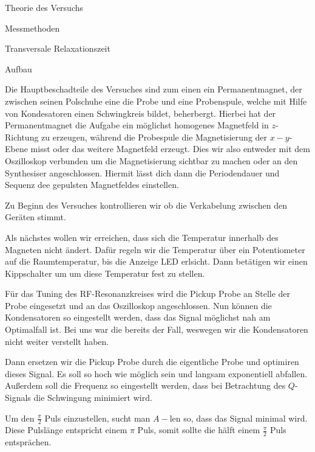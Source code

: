 \documentclass[pdftex, a4paper,11pt, twoside, ngerman]{report}
\begin{document}
\begin{chapter}{Theorie des Versuchs}
\begin{section}{Messmethoden}
\begin{subsection}{Transversale Relaxationszeit}
        \end{subsection}

    \end{section}

    \begin{section}{Aufbau}

        Die Hauptbeschadteile des Versuches sind zum einen ein Permanentmagnet, der zwischen seinen Polschuhe eine die Probe und eine Probenspule, welche mit Hilfe von Kondesatoren einen Schwingkreis bildet, beherbergt.
        Hierbei hat der Permanentmagnet die Aufgabe ein möglichst homogenes Magnetfeld in $z$-Richtung zu erzeugen, während die Probespule die Magnetisierung der $x-y$-Ebene misst oder das weitere Magnetfeld erzeugt.
        Dies wir also entweder mit dem Oszilloskop verbunden um die Magnetisierung sichtbar zu machen oder an den Synthesiser angeschlossen.
        Hiermit lässt dich dann die Periodendauer und Sequenz dee gepulsten Magnetfeldes einstellen.

        Zu Beginn des Versuches kontrollieren wir ob die Verkabelung zwischen den Geräten stimmt.

        Als nächstes wollen wir erreichen, dass sich die Temperatur innerhalb des Magneten nicht ändert. 
        Dafür regeln wir die Temperatur über ein Potentiometer auf die Raumtemperatur, bis die Anzeige LED erlsicht.
        Dann betätigen wir einen Kippschalter um um diese Temperatur fest zu stellen.

        Für das Tuning des RF-Resonanzkreises wird die Pickup Probe an Stelle der Probe eingesetzt und an das Oszilloskop angeschlossen.
        Nun können die Kondensatoren so eingestellt werden, dass das Signal möglichst nah am Optimalfall ist.
        Bei uns war die bereits der Fall, weswegen wir die Kondensatoren
nicht weiter verstellt haben.

        Dann ersetzen wir die Pickup Probe durch die eigentliche Probe und optimiren dieses Signal.
        Es soll so hoch wie möglich sein und langsam exponentiell abfallen.
        Außerdem soll die Frequenz so eingestellt werden, dass bei Betrachtung des $Q$-Signals die Schwingung minimiert wird.

        Um den $\frac \pi 2$ Puls einzustellen, sucht man $A-\text{len}$ so, dass das Signal minimal wird. 
        Diese Pulslänge entspricht einem $\pi$ Puls, somit sollte die hälft einem $\frac \pi 2$ Puls entsprächen.

    \end{section}
    
  \end{chapter}
  
\end{document}
